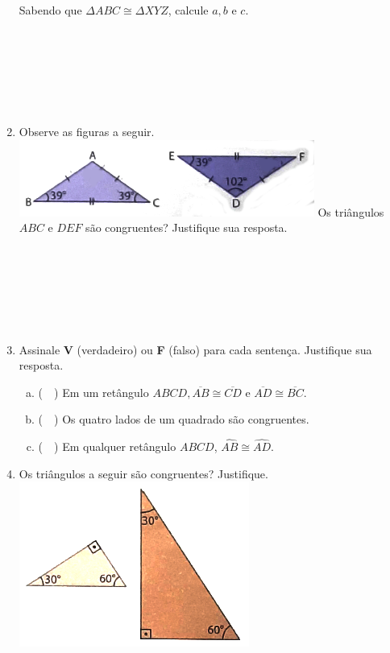 \documentclass[a4paper,14pt]{article}
\begin{document}
\begin{multicols}{2}
\begin{enumerate}
			Sabendo que $\Delta$$ABC \cong \Delta$$XYZ$, calcule $a, b$ e $c$.
			\\\\\\\\\\\\\\
			\item Observe as figuras a seguir.
			\includegraphics[width=1\linewidth]{6FMA108_imagens/imagem4}
			Os triângulos $ABC$ e $DEF$ são congruentes? Justifique sua resposta.
			\\\\\\\\\\\\\\
			\item Assinale \textbf{V} (verdadeiro) ou \textbf{F} (falso) para cada sentença. Justifique sua resposta.
			\begin{enumerate}[a)]
				\item (~~) Em um retângulo $ABCD, \overline{AB} \cong \overline{CD}$ e $\overline{AD} \cong \overline{BC}$.
				\item (~~) Os quatro lados de um quadrado são congruentes.
				\item (~~) Em qualquer retângulo $ABCD$, $\hat{AB} \cong \hat{AD}$.
			\end{enumerate}
			\item Os triângulos a seguir são congruentes? Justifique. \\
			\includegraphics[width=1\linewidth]{6FMA108_imagens/imagem5} \\\\\\

\end{enumerate}
\end{multicols}
\end{document}
